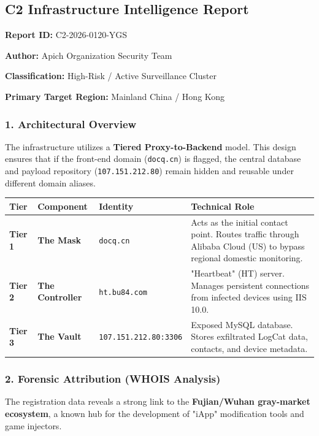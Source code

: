 \documentclass[
]{article}
\begin{document}
\subsection{C2 Infrastructure Intelligence
Report}\label{c2-infrastructure-intelligence-report}

\textbf{Report ID:} C2-2026-0120-YGS

\textbf{Author:} Apich Organization Security Team

\textbf{Classification:} High-Risk / Active Surveillance Cluster

\textbf{Primary Target Region:} Mainland China / Hong Kong

\subsubsection{1. Architectural
Overview}\label{1-architectural-overview}

The infrastructure utilizes a \textbf{Tiered Proxy-to-Backend} model.
This design ensures that if the front-end domain (\texttt{docq.cn}) is
flagged, the central database and payload repository
(\texttt{107.151.212.80}) remain hidden and reusable under different
domain aliases.

\begin{longtable}[]{@{}llll@{}}
\toprule\noalign{}
Tier & Component & Identity & Technical Role \\
\midrule\noalign{}
\endhead
\bottomrule\noalign{}
\endlastfoot
\textbf{Tier 1} & \textbf{The Mask} & \texttt{docq.cn} & Acts as the
initial contact point. Routes traffic through Alibaba Cloud (US) to
bypass regional domestic monitoring. \\
\textbf{Tier 2} & \textbf{The Controller} & \texttt{ht.bu84.com} &
"Heartbeat" (HT) server. Manages persistent connections from infected
devices using IIS 10.0. \\
\textbf{Tier 3} & \textbf{The Vault} & \texttt{107.151.212.80:3306} &
Exposed MySQL database. Stores exfiltrated LogCat data, contacts, and
device metadata. \\
\end{longtable}

\subsubsection{2. Forensic Attribution (WHOIS
Analysis)}\label{2-forensic-attribution-whois-analysis}

The registration data reveals a strong link to the \textbf{Fujian/Wuhan
gray-market ecosystem}, a known hub for the development of "iApp"
modification tools and game injectors.
\end{document}

